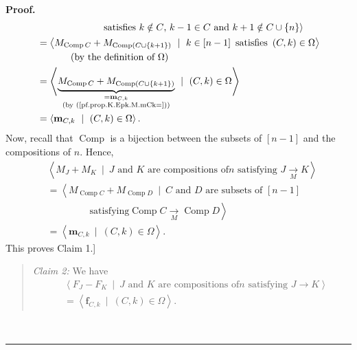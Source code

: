 \documentclass[numbers=enddot,12pt,final,onecolumn,notitlepage]{scrartcl}%
\theoremstyle{definition}
\newenvironment{statement}{\begin{quote}}{\end{quote}}
\newenvironment{proof}[1][Proof]{\noindent\textbf{#1.} }{\ \rule{0.5em}{0.5em}}
\begin{document}
\begin{proof}
\begin{align*}
&  \ \ \ \ \ \ \ \ \ \ \ \ \ \ \ \ \ \ \ \ \left.  \text{satisfies }k\notin
C\text{, }k-1\in C\text{ and }k+1\notin C\cup\left\{  n\right\}  \right\rangle
\\
&  =\left\langle M_{\operatorname*{Comp}C}+M_{\operatorname*{Comp}\left(
C\cup\left\{  k+1\right\}  \right)  }\ \mid\ k\in\left[  n-1\right]
\ \text{satisfies }\left(  C,k\right)  \in\Omega\right\rangle \\
&  \ \ \ \ \ \ \ \ \ \ \left(  \text{by the definition of }\Omega\right) \\
&  =\left\langle \underbrace{M_{\operatorname*{Comp}C}+M_{\operatorname*{Comp}%
\left(  C\cup\left\{  k+1\right\}  \right)  }}_{\substack{=\mathbf{m}%
_{C,k}\\\text{(by (\ref{pf.prop.K.Epk.M.mCk=}))}}}\ \mid\ \left(  C,k\right)
\in\Omega\right\rangle \\
&  =\left\langle \mathbf{m}_{C,k}\ \mid\ \left(  C,k\right)  \in
\Omega\right\rangle .
\end{align*}
Now, recall that $\operatorname*{Comp}$ is a bijection between the subsets of
$\left[  n-1\right]  $ and the compositions of $n$. Hence,%
\begin{align*}
&  \left\langle M_{J}+M_{K}\ \mid\ J\text{ and }K\text{ are compositions of
}n\text{ satisfying }J\underset{M}{\rightarrow}K\right\rangle \\
&  =\left\langle M_{\operatorname*{Comp}C}+M_{\operatorname*{Comp}D}%
\ \mid\ C\text{ and }D\text{ are subsets of }\left[  n-1\right]  \right. \\
&  \ \ \ \ \ \ \ \ \ \ \ \ \ \ \ \ \ \ \ \ \left.  \text{satisfying
}\operatorname*{Comp}C\underset{M}{\rightarrow}\operatorname*{Comp}%
D\right\rangle \\
&  =\left\langle \mathbf{m}_{C,k}\ \mid\ \left(  C,k\right)  \in
\Omega\right\rangle .
\end{align*}
This proves Claim 1.]

\begin{statement}
\textit{Claim 2:} We have%
\begin{align*}
&  \left\langle F_{J}-F_{K}\ \mid\ J\text{ and }K\text{ are compositions of
}n\text{ satisfying }J\rightarrow K\right\rangle \\
&  =\left\langle \mathbf{f}_{C,k}\ \mid\ \left(  C,k\right)  \in
\Omega\right\rangle .
\end{align*}

\end{statement}


\end{proof}
\end{document}
